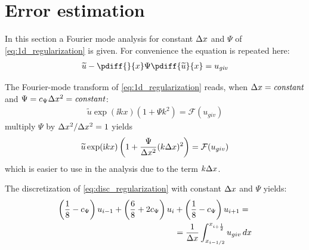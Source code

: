 \chapter{Error estimation}\label{sec:error_estimation}
In this section a Fourier mode analysis for constant $\Delta x$ and $\Psi$ of \autoref{eq:1d_regularization} is given.
For convenience the equation is repeated here:
%
\begin{align}
    \widetilde u - \pdiff{}{x}  \Psi \pdiff{\widetilde u}{x} = u_{\it{giv}}
\end{align}

The Fourier-mode transform of \autoref{eq:1d_regularization} reads, when $\Delta x = \it{constant}$ and $\Psi = c_{\Psi} \Delta x^2 = \it{constant}$:
\begin{align}
\widetilde u \exp(\ii k x) \left( 1 + \Psi k^2 \right) = \mathcal{F}(u_{giv})
\end{align}
multiply $\Psi$ by $\Delta x^2/\Delta x^2 = 1$ yields
\begin{align}
\widetilde u \exp({\rm i} k x) \left( 1 + \frac{\Psi}{\Delta x^2} (k\Delta x)^2 \right) = \mathcal{F}(u_{giv})
\label{eq:F_regularization}
\end{align}
which is easier to use in the analysis due to the term $k\Delta x$.

The discretization of \autoref{eq:disc_regularization} with constant $\Delta x$ and $\Psi$ yields:
\begin{align}
\left( \frac{1}{8}
- c_{\Psi} \right)  u_{i-1}
+ \left( \frac{6}{8} + 2c_{\Psi}\right)  u_i & +
\left(  \frac{1}{8} - c_{\Psi} \right)  u_{i+1}  =
\\
& = \frac{1}{\Delta x}\int_{x_{i-1/2}}^{x_{i+\frac{1}{2}}} u_{giv}\, dx
\end{align}

